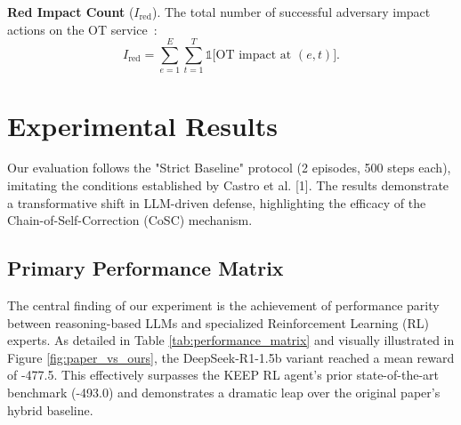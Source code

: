 \documentclass[letterpaper, 10 pt, conference]{ieeeconf}
\begin{document}
\textbf{Red Impact Count} ($I_{\mathrm{red}}$). The total number of successful adversary impact actions on the OT service~\cite{arXiv:2410.17351}:
\begin{equation}
\label{eq:impact}
  I_{\mathrm{red}} = \sum_{e=1}^{E}\sum_{t=1}^{T}
  \mathbb{1}\!\bigl[\text{OT impact at }(e,t)\bigr].
\end{equation}





\section{Experimental Results}
Our evaluation follows the "Strict Baseline" protocol (2 episodes, 500 steps each), imitating the conditions established by Castro et al. [1]. The results demonstrate a transformative shift in LLM-driven defense, highlighting the efficacy of the Chain-of-Self-Correction (CoSC) mechanism.

\subsection{Primary Performance Matrix}
The central finding of our experiment is the achievement of performance parity between reasoning-based LLMs and specialized Reinforcement Learning (RL) experts. As detailed in Table \ref{tab:performance_matrix} and visually illustrated in Figure \ref{fig:paper_vs_ours}, the DeepSeek-R1-1.5b variant reached a mean reward of -477.5. This effectively surpasses the KEEP RL agent's prior state-of-the-art benchmark (-493.0) and demonstrates a dramatic leap over the original paper's hybrid baseline.

\begin{table}[h]
\centering
\caption{Performance Parity Matrix (500-step Strict Horizon)}
\label{tab:performance_matrix}
\end{table}
\end{document}
